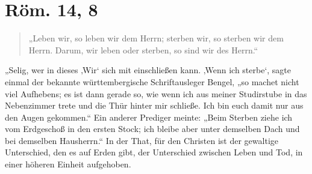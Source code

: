 \chapter{Röm. 14, 8}

\begin{quote}
„Leben wir, so leben wir dem Herrn; sterben wir, so sterben wir dem Herrn. Darum, wir leben oder sterben, so sind wir des Herrn.“
\end{quote}

„Selig, wer in dieses ‚Wir‘ sich mit einschließen kann. ‚Wenn ich sterbe‘, sagte einmal der bekannte württembergische Schriftausleger Bengel, „so machet nicht viel Aufhebens; es ist dann gerade so, wie wenn ich aus meiner Studirstube in das Nebenzimmer trete und die Thür hinter mir schließe. Ich bin euch damit nur aus den Augen gekommen.“ Ein anderer Prediger meinte: „Beim Sterben ziehe ich vom Erdgeschoß in den ersten Stock; ich bleibe aber unter demselben Dach und bei demselben Hausherrn.“ In der That, für den Christen ist der gewaltige Unterschied, den es auf Erden gibt, der Unterschied zwischen Leben und Tod, in einer höheren Einheit aufgehoben.
